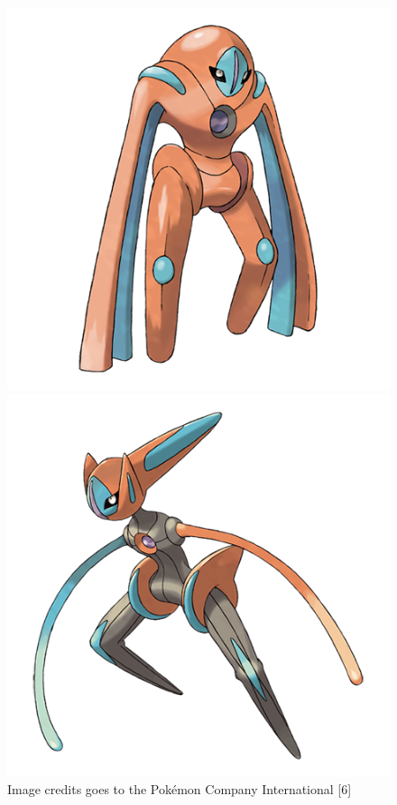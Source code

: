 \documentclass{article}
\begin{document}
\begin{figure}[H]
\begin{minipage}{.25\textwidth}
\end{minipage}%
\begin{minipage}{.25\textwidth}
	\includegraphics[width=\textwidth]{386_f3.png}
\end{minipage}%
\begin{minipage}{.25\textwidth}
	\includegraphics[width=\textwidth]{386_f4.png}
\end{minipage}
\centering
\caption{Image credits goes to the Pok\'emon Company International [6]}
\end{figure}
\end{document}
